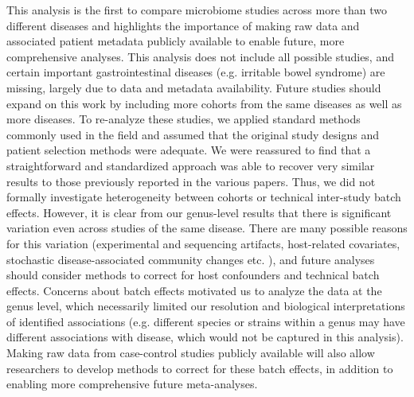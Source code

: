 This analysis is the first to compare microbiome studies across more than two different diseases and highlights the importance of making raw data and associated patient metadata publicly available to enable future, more comprehensive analyses.
This analysis does not include all possible studies, and certain important gastrointestinal diseases (e.g. irritable bowel syndrome) are missing, largely due to data and metadata availability.
Future studies should expand on this work by including more cohorts from the same diseases as well as more diseases.
To re-analyze these studies, we applied standard methods commonly used in the field and assumed that the original study designs and patient selection methods were adequate.
We were reassured to find that a straightforward and standardized approach was able to recover very similar results to those previously reported in the various papers.
Thus, we did not formally investigate heterogeneity between cohorts or technical inter-study batch effects.
However, it is clear from our genus-level results that there is significant variation even across studies of the same disease.
There are many possible reasons for this variation (experimental and sequencing artifacts, host-related covariates, stochastic disease-associated community changes etc. \cite{ zaneveld2017karenina,Falony2016variation, David2014lifestyle}), and future analyses should consider methods to correct for host confounders and technical batch effects.
Concerns about batch effects motivated us to analyze the data at the genus level, which necessarily limited our resolution and biological interpretations of identified associations (e.g. different species or strains within a genus may have different associations with disease, which would not be captured in this analysis).
Making raw data from case-control studies publicly available will also allow researchers to develop methods to correct for these batch effects, in addition to enabling more comprehensive future meta-analyses.

